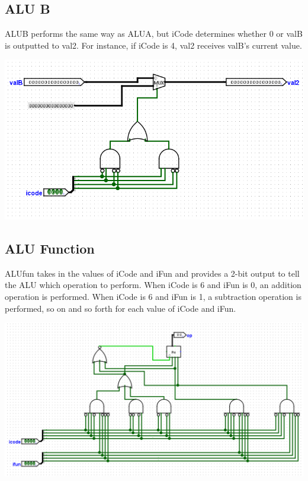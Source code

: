 \documentclass{article}
\begin{document}
\subsection{ALU B}
ALUB performs the same way as ALUA, but iCode determines whether 0 or valB is outputted to val2. For instance, if iCode is 4, val2 receives valB's current value. 
\begin{center}
    \includegraphics[scale=.7]{alu_b.png}
\end{center}
\subsection{ALU Function}
ALUfun takes in the values of iCode and iFun and provides a 2-bit output to tell the ALU which operation to perform. When iCode is 6 and iFun is 0, an addition operation is performed. When iCode is 6 and iFun is 1, a subtraction operation is performed, so on and so forth for each value of iCode and iFun. 
\begin{center}
    \includegraphics[scale=.55]{alu_fun.png}
\end{center}
\end{document}
